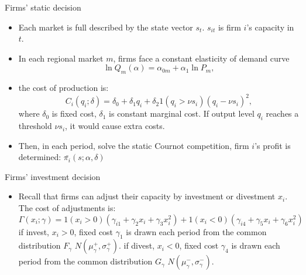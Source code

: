 \documentclass[aspectratio=169]{beamer}  %
\begin{document}
\begin{frame}{Firms' static decision}    
    \begin{itemize}
    \item Each market is full described by the state vector $s_{t}$. $s_{it}$ is firm $i$'s capacity in $t$.
    \item In each regional market $m$, firms face a constant elasticity of demand curve
    \[
    \ln Q_{m}(\alpha) = \alpha_{0m} + \alpha_1 \ln P_{m},
    \]
    \item the cost of production is:
    \[
    C_i(q_i; \delta) = \delta_0 + \delta_1 q_i + \delta_2 1(q_i > \nu s_i)(q_i - \nu s_i)^2, 
    \]
    where $\delta_0$ is fixed cost, $\delta_1$ is constant marginal cost. If output level $q_{i}$ reaches a threshold $\nu s_i$, it would cause extra costs.
    \item Then, in each period, solve the static Cournot competition, firm $i$'s profit is determined: $\bar{\pi_i}(s;\alpha, \delta)$
  
    \end{itemize}
\end{frame}

\begin{frame}{Firms' investment decision}    
    \begin{itemize}
   \item Recall that firms can adjust their capacity by investment or divestment $x_i$. The cost of adjustments is:
   \[
    \Gamma(x_i;\gamma)=1(x_i>0)(\gamma_{i1}+\gamma_2x_i+\gamma_3x_i^2)+1(x_i<0)(\gamma_{i4}+\gamma_5x_i+\gamma_6x_i^2)
    \]
    if invest, $x_i>0$, fixed cost $\gamma_{1}$ is drawn each period from the common distribution $F_{\gamma}$ $N(\mu_{\gamma}^+,\sigma_{\gamma}^+)$.
    if divest, $x_i<0$, fixed cost $\gamma_{4}$ is drawn each period from the common distribution $G_{\gamma}$ $N(\mu_{\gamma}^-,\sigma_{\gamma}^-)$.
    \end{itemize}
\end{frame}
\end{document}
